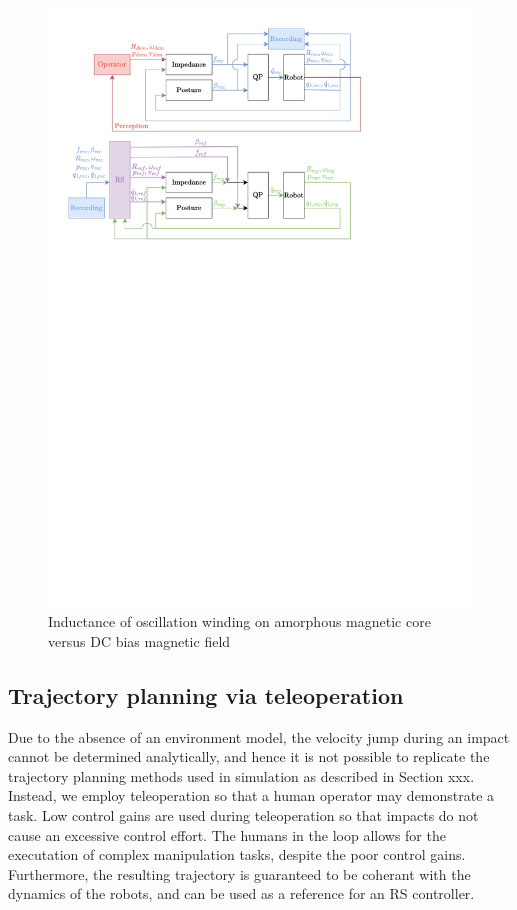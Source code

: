 \documentclass[a4paper, 10pt, conference]{ieeeconf}
\begin{document}
\begin{figure}[h]
    \includegraphics[trim={1cm 17.8cm 5cm 6.5cm}, clip]{Graphics/qp.pdf}
      \caption{Inductance of oscillation winding on amorphous
       magnetic core versus DC bias magnetic field}
      \label{figurelabel}
   \end{figure}

    \subsection{Trajectory planning via teleoperation}
    Due to the absence of an environment model, the velocity jump during an impact cannot be determined analytically, and hence it is not possible to replicate the trajectory planning methods used in simulation as described in Section xxx. Instead, we employ teleoperation so that a human operator may demonstrate a task. Low control gains are used during teleoperation so that impacts do not cause an excessive control effort. The humans in the loop allows for the executation of complex manipulation tasks, despite the poor control gains. Furthermore, the resulting trajectory is guaranteed to be coherant with the dynamics of the robots, and can be used as a reference for an RS controller.
\end{document}
